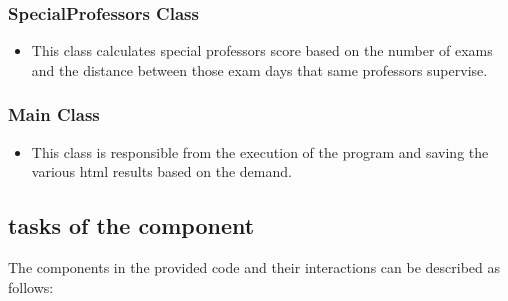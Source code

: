 \subsubsection{SpecialProfessors Class}


\begin{itemize}
\item This class calculates special professors score based on the number of exams and the distance between those exam days that same professors supervise.

\end{itemize}

\subsubsection{Main Class}


\begin{itemize}
\item This class is responsible from the execution of the program and saving the various html results based on the demand.
\end{itemize}









\subsection{tasks of the component}
The components in the provided code and their interactions can be described as follows:

